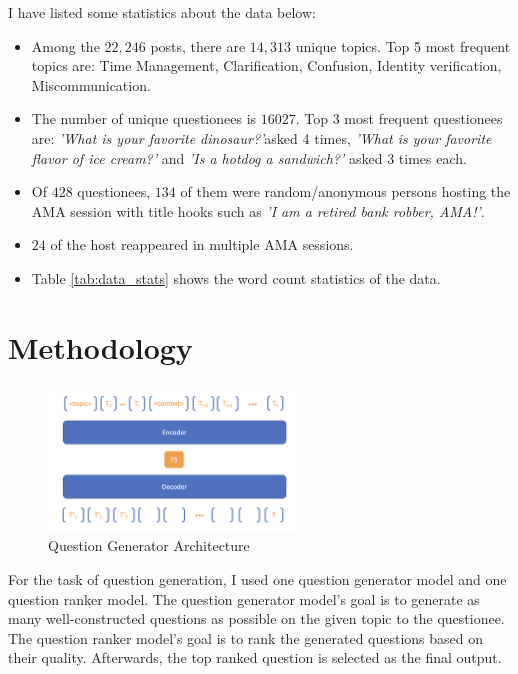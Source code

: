 \documentclass[paper=a4, fontsize=11pt]{scrartcl}
\numberwithin{equation}{section}		%
\numberwithin{figure}{section}			%
\numberwithin{table}{section}				%
\begin{document}
I have listed some statistics about the data below:
\begin{itemize}
  \item Among the $22,246$ posts, there are $14,313$ unique topics. Top 5 most frequent topics are: Time Management, Clarification, Confusion, Identity verification, Miscommunication.
  \item The number of unique questionees is $16027$. Top 3 most frequent questionees are: \textit{'What is your favorite dinosaur?'}asked 4 times, \textit{'What is your favorite flavor of ice cream?'} and \textit{'Is a hotdog a sandwich?'} asked 3 times each.
  \item Of $428$ questionees, $134$ of them were random/anonymous persons hosting the AMA session with title hooks such as \textit{'I am a retired bank robber, AMA!'}.
  \item $24$ of the host reappeared in multiple AMA sessions.
  \item Table \ref{tab:data_stats} shows the word count statistics of the data.
\end{itemize}

\section{Methodology}

\begin{figure}[t]
  \centering
  \includegraphics[width=0.6\textwidth]{t5.png}
  \caption{Question Generator Architecture}
  \label{fig:question_generator}
\end{figure}


For the task of question generation, I used one question generator model and one question ranker model. 
The question generator model's goal is to generate as many well-constructed questions as possible on the given topic to the questionee.
The question ranker model's goal is to rank the generated questions based on their quality.
Afterwards, the top ranked question is selected as the final output.
\end{document}
